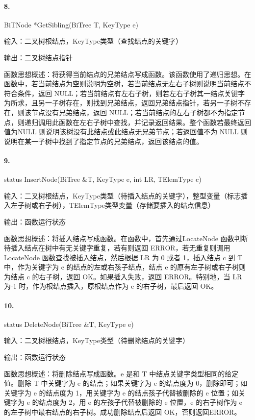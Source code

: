 \documentclass[supercite]{Experimental_Report}
\theoremstyle{definition}
\begin{document}
\paragraph{ 8.}BiTNode *GetSibling(BiTree T, KeyType e)

输入：二叉树根结点，KeyType类型（查找结点的关键字）

输出：二叉树结点指针

函数思想概述：将获得当前结点的兄弟结点写成函数。该函数使用了递归思想。在函数中，若当前结点为空则说明为空树，若当前结点无左右子树则说明当前结点不符合条件，返回 NULL；若当前结点有左右子树，则若左右子树其一结点关键字为所求，且另一子树存在，则找到兄弟结点，返回兄弟结点指针，若另一子树不存在，则该节点没有兄弟结点，返回 NULL；若当前结点的左右子树都不为指定节点，则递归调用此函数在左右子树中查找，并记录返回结果。整个函数若最终返回值为NULL 则说明该树没有此结点或此结点无兄弟节点；若返回值不为 NULL 则说明在某一子树中找到了指定节点的兄弟结点，返回该结点的值。

\paragraph{ 9.}status InsertNode(BiTree \&T, KeyType e, int LR, TElemType c)

输入：二叉树根结点，KeyType类型（待插入结点的关键字），整型变量（标志插入左子树或右子树），TElemType类型变量（存储要插入的结点信息）

输出：函数运行状态

函数思想概述：将插入结点写成函数。在函数中，首先通过LocateNode 函数判断待插入结点在树中有无关键字重复，若有则返回 ERROR，若无重复则调用 LocateNode 函数查找被插入结点，然后根据 LR 为 0 或者 1，插入结点 c 到 T 中，作为关键字为 e 的结点的左或右孩子结点，结点 e 的原有左子树或右子树则为结点 c 的右子树，返回 OK。如果插入失败，返回 ERROR。特别地，当 LR 为-1 时，作为根结点插入，原根结点作为 c 的右子树，最后返回 OK。

\paragraph{10.}status DeleteNode(BiTree \&T, KeyType e)

输入：二叉树根结点，KeyType类型（待删除结点的关键字）

输出：函数运行状态

函数思想概述：将删除结点写成函数。e 是和 T 中结点关键字类型相同的给定值。删除 T 中关键字为 e 的结点；如果关键字为 e 的结点度为 0，删除即可；如关键字为 e 的结点度为 1，用关键字为 e 的结点孩子代替被删除的 e 位置；如关键字为 e 的结点度为 2，用 e 的左孩子代替被删除的 e 位置，e 的右子树作为 e 的左子树中最右结点的右子树。成功删除结点后返回 OK，否则返回ERROR。
\end{document}
